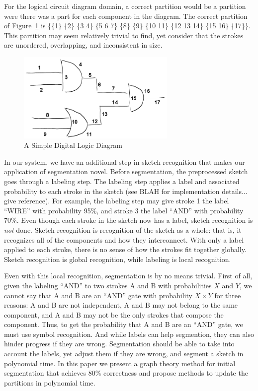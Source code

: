 \documentclass[10pt]{acmsiggraph}               %
\begin{document}
For the logical circuit diagram domain, a correct partition would be a partition were there was a part for each component in the diagram.
The correct partition of Figure~\ref{fig:simple} is \{\{1\} \{2\} \{3 4\} \{5 6 7\} \{8\} \{9\} \{10 11\} \{12 13 14\} \{15 16\} \{17\}\}.
This partition may seem relatively trivial to find, yet consider that the strokes are unordered, overlapping, and inconsistent in size.

\begin{figure}[h]
\centering
\includegraphics[width=3.0in]{nums.png}%
\caption{A Simple Digital Logic Diagram}
\label{fig:simple}
\end{figure}

In our system, we have an additional step in sketch recognition that makes our application of segmentation novel.
Before segmentation, the preprocessed sketch goes through a labeling step.
The labeling step applies a label and associated probability to each stroke in the sketch (see BLAH for implementation details... give reference).
For example, the labeling step may give stroke 1 the label ``WIRE'' with probability 95\%, and stroke 3 the label ``AND'' with probability 70\%.
Even though each stroke in the sketch now has a label, sketch recognition is \emph{not} done.
Sketch recognition is recognition of the sketch as a whole: that is, it recognizes all of the components and how they interconnect.
With only a label applied to each stroke, there is no sense of how the strokes fit together globally.
Sketch recognition is global recognition, while labeling is local recognition.

Even with this local recognition, segmentation is by no means trivial.
First of all, given the labeling ``AND'' to two strokes A and B with probabilities $X$ and $Y$, we cannot say that A and B are an ``AND'' gate with probability $X \times Y$ for three reasons: A and B are not independent, A and B may not belong to the same component, and A and B may not be the only strokes that compose the component.
Thus, to get the probability that A and B are an ``AND'' gate, we must use symbol recognition.
And while labels can help segmention, they can also hinder progress if they are wrong.
Segmentation should be able to take into account the labels, yet adjust them if they are wrong, and segment a sketch in polynomial time.
In this paper we present a graph theory method for initial segmentation that achieves 80\% correctness and propose methods to update the partitions in polynomial time.
\end{document}
